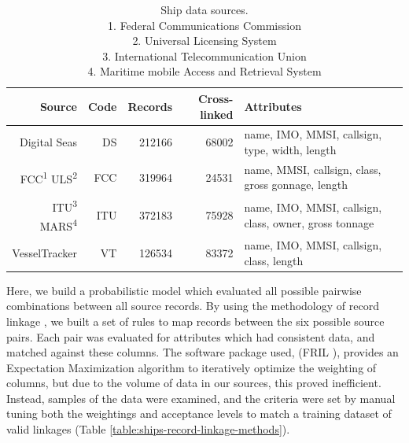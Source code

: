 \begin{table}[htbp]
  \begin{tabular}{rrrrl}%
    \hline
    Source & Code & Records & Cross-linked & Attributes \\
    \hline
     Digital Seas & DS & 212166 & 68002 & {\footnotesize name, IMO, MMSI, callsign, type, width, length} \\
      FCC\textsuperscript{1} ULS\textsuperscript{2} & FCC & 319964 & 24531 & {\footnotesize name, MMSI, callsign, class, gross gonnage, length} \\
      ITU\textsuperscript{3} MARS\textsuperscript{4} & ITU & 372183 & 75928 & {\footnotesize name, IMO, MMSI, callsign, class, owner, gross tonnage}\\ 
     VesselTracker & VT & 126534 & 83372 & {\footnotesize name, IMO, MMSI, callsign, class, length}
  \end{tabular}
  \caption{Ship data sources.\\ 
  1. Federal Communications Commission \\ 
  2. Universal Licensing System \\
  3. International Telecommunication Union \\ 
  4. Maritime mobile Access and Retrieval System}
  \label{table:ships-data-sources}
\end{table}

Here, we build a probabilistic model which evaluated all possible pairwise combinations between all source records. By using the methodology of record linkage \cite{Christen2012}, we built a set of rules to map records between the six possible source pairs. Each pair was evaluated for attributes which had consistent data, and matched against these columns. The software package used, (FRIL \cite{Jurczyk2008fril}), provides an Expectation Maximization algorithm to iteratively optimize the weighting of columns, but due to the volume of data in our sources, this proved inefficient. Instead, samples of the data were examined, and the criteria were set by manual tuning both the weightings and acceptance levels to match a training dataset of valid linkages (Table \ref{table:ships-record-linkage-methods}). %

